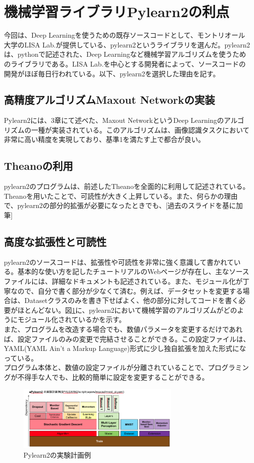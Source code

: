 \section{機械学習ライブラリPylearn2の利点}
今回は、Deep Learningを使うための既存ソースコードとして、モントリオール大学のLISA Lab.が提供している、pylearn2というライブラリを選んだ\cite{goodfellow2013pylearn2:}。pylearn2は、pythonで記述された、Deep Learningなど機械学習アルゴリズムを使うためのライブラリである。LISA Lab.を中心とする開発者によって、ソースコードの開発がほぼ毎日行われている。以下、pylearn2を選択した理由を記す。
\subsection{高精度アルゴリズムMaxout Networkの実装}
Pylearn2には、3章にて述べた、Maxout NetworkというDeep Learningのアルゴリズムの一種が実装されている。このアルゴリズムは、画像認識タスクにおいて非常に高い精度を実現しており、基準1を満たす上で都合が良い。
\subsection{Theanoの利用}
pylearn2のプログラムは、前述したTheanoを全面的に利用して記述されている。Theanoを用いたことで、可読性が大きく上昇している。また、何らかの理由で、pylearn2の部分的拡張が必要になったときでも、[過去のスライドを基に加筆]
\subsection{高度な拡張性と可読性}
pylearn2のソースコードは、拡張性や可読性を非常に強く意識して書かれている。基本的な使い方を記したチュートリアルのWebページが存在し、主なソースファイルには、詳細なドキュメントも記述されている。また、モジュール化が丁寧なので、自分で書く部分が少なくて済む。例えば、データセットを変更する場合は、Datasetクラスのみを書き下せばよく、他の部分に対してコードを書く必要がほとんどない。図\ref{c4_pylearn2_yaml}に、pylearn2において機械学習のアルゴリズムがどのようにモジュール化されているかを示す。\\
また、プログラムを改造する場合でも、数値パラメータを変更するだけであれば、設定ファイルのみの変更で完結させることができる。この設定ファイルは、YAML(YAML Ain't a Markup Language)形式に少し独自拡張を加えた形式になっている。\\
プログラム本体と、数値の設定ファイルが分離されていることで、プログラミングが不得手な人でも、比較的簡単に設定を変更することができる。\\
\begin{figure}[tbp]
 \begin{center}
  \includegraphics[width=80mm]{img/c4/pylearn2_yaml}
 \end{center}
 \caption{Pylearn2の実験計画例}
 \label{c4_pylearn2_yaml}
\end{figure}
